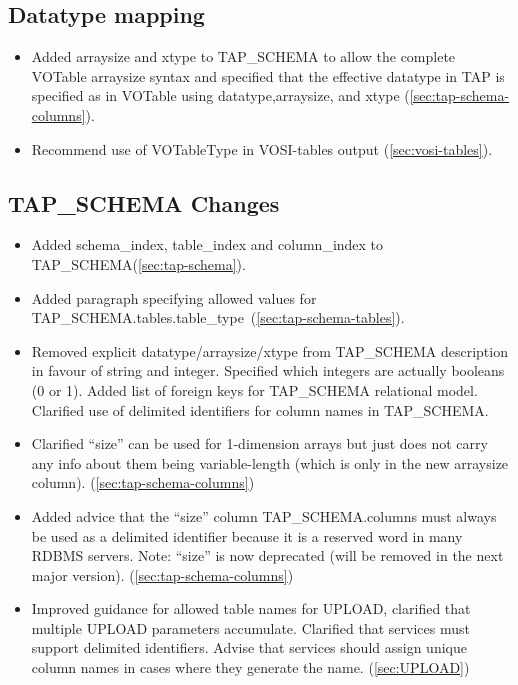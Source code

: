 \documentclass[11pt,letter]{ivoa}
\newcommand{\tapschema}{TAP\_SCHE\-MA}
\newcommand{\tapschema}{\mbox{%
  \relsize{-0.5}TAP\discretionary{-}{}{\kern-2pt\_}SCHEMA}}
\begin{document}
\subsection{Datatype mapping}

\begin{itemize}
\item Added arraysize and xtype to \tapschema{} to allow the complete VOTable arraysize syntax and specified that the effective datatype in TAP is specified as in VOTable using datatype,arraysize, and xtype (\ref{sec:tap-schema-columns}).

\item Recommend use of VOTableType in VOSI-tables output (\ref{sec:vosi-tables}). 
\end{itemize}

\subsection{TAP\_SCHEMA Changes}

\begin{itemize}
\item Added schema\_index, table\_index and column\_index to \tapschema (\ref{sec:tap-schema}).


\item Added paragraph specifying allowed values for \tapschema.tables.table\_type\ (\ref{sec:tap-schema-tables}).

\item Removed explicit datatype/arraysize/xtype from \tapschema{} description
in favour of string and integer. Specified which integers are actually
booleans (0 or 1). Added list of foreign keys for \tapschema{}
relational model. Clarified use of delimited identifiers for column names in 
\tapschema. 

\item Clarified ``size'' can be used for 1-dimension arrays but just does not carry any info about them being variable-length (which is only in the new arraysize column).
(\ref{sec:tap-schema-columns})

\item Added advice that the ``size'' column \tapschema.columns must always be used 
as a delimited identifier because it is a reserved word in many RDBMS 
servers. Note: ``size'' is now deprecated (will be removed in the next major version).
(\ref{sec:tap-schema-columns})

\item Improved guidance for allowed table names for UPLOAD, clarified that 
multiple UPLOAD parameters accumulate. Clarified that services 
must support delimited identifiers. Advise that services should assign unique 
column names in cases where they generate the name.
(\ref{sec:UPLOAD})

\end{itemize}
\end{document}
